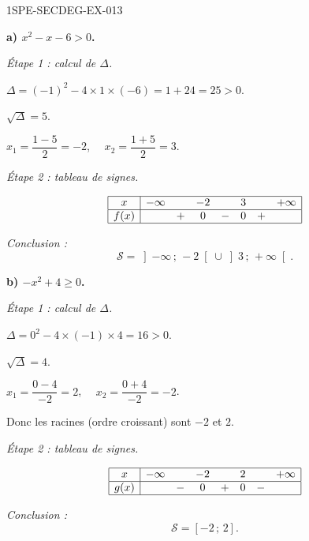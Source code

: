 \begin{corrige}{1SPE-SECDEG-EX-013}

\textbf{a) $x^2 - x - 6 > 0$.}

\textit{Étape 1 : calcul de $\Delta$.}


$\Delta = (-1)^2 - 4 \times 1 \times (-6) = 1 + 24 = 25 > 0$.

$\sqrt{\Delta} = 5$.

$x_1 = \dfrac{1 - 5}{2} = -2$, $\quad x_2 = \dfrac{1 + 5}{2} = 3$.

\textit{Étape 2 : tableau de signes.}


\[
\begin{array}{|c|ccccccc|}
\hline
x & -\infty & & -2 & & 3 & & +\infty \\
\hline
f(x) & & + & 0 & - & 0 & + & \\
\hline
\end{array}
\]

\textit{Conclusion :}
\[\boxed{\mathcal{S} = \left]-\infty\,;\,-2\right[ \cup \left]3\,;\,+\infty\right[.}\]

\medskip
\textbf{b) $-x^2 + 4 \geqslant 0$.}

\textit{Étape 1 : calcul de $\Delta$.}


$\Delta = 0^2 - 4 \times (-1) \times 4 = 16 > 0$.

$\sqrt{\Delta} = 4$.

$x_1 = \dfrac{0 - 4}{-2} = 2$, $\quad x_2 = \dfrac{0 + 4}{-2} = -2$.

Donc les racines (ordre croissant) sont $-2$ et $2$.

\textit{Étape 2 : tableau de signes.}


\[
\begin{array}{|c|ccccccc|}
\hline
x & -\infty & & -2 & & 2 & & +\infty \\
\hline
g(x) & & - & 0 & + & 0 & - & \\
\hline
\end{array}
\]

\textit{Conclusion :}
\[\boxed{\mathcal{S} = \left[-2\,;\,2\right].}\]

\end{corrige}
